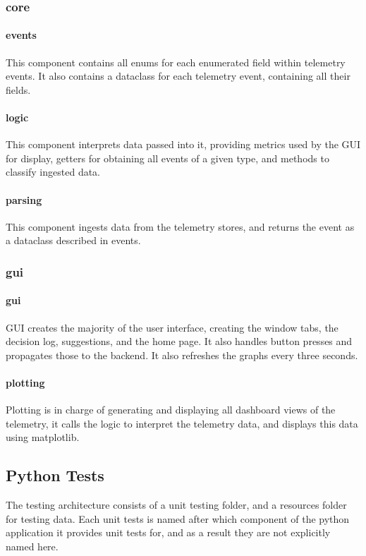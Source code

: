 \documentclass[11pt]{article}
\begin{document}
\subsubsection{core}
\paragraph{events}
This component contains all enums for each enumerated field within telemetry events. It also contains a dataclass for each telemetry event, containing all their fields.

\paragraph{logic}
This component interprets data passed into it, providing metrics used by the GUI for display, getters for obtaining all events of a given type, and methods to classify ingested data.
\paragraph{parsing}
This component ingests data from the telemetry stores, and returns the event as a dataclass described in events.

\subsubsection{gui}

\paragraph{gui}
GUI creates the majority of the user interface, creating the window tabs, the decision log, suggestions, and the home page. It also handles button presses and propagates those to the backend. It also refreshes the graphs every three seconds.

\paragraph{plotting}
Plotting is in charge of generating and displaying all dashboard views of the telemetry, it calls the logic to interpret the telemetry data, and displays this data using matplotlib.

\subsection{Python Tests}
The testing architecture consists of a unit testing folder, and a resources folder for testing data. Each unit tests is named after which component of the python application it provides unit tests for, and as a result they are not explicitly named here. 
\end{document}
